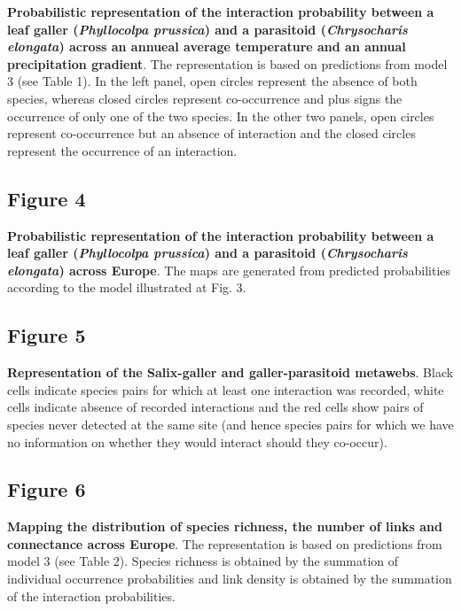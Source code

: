 \documentclass[12pt]{article}
\begin{document}
\textbf{Probabilistic representation of the interaction probability between a
leaf galler (\textit{Phyllocolpa prussica}) and a parasitoid
(\textit{Chrysocharis elongata}) across an annueal average temperature and an
annual precipitation gradient}. The representation is based on predictions
from model 3 (see Table 1). In the left panel, open circles represent the
absence of both species, whereas closed circles represent co-occurrence and
plus signs the occurrence of only one of the two species. In the other two
panels, open circles represent co-occurrence but an absence of interaction and
the closed circles represent the occurrence of an interaction.

\subsection*{Figure 4}

\textbf{Probabilistic representation of the interaction probability between a
leaf galler (\textit{Phyllocolpa prussica}) and a parasitoid
(\textit{Chrysocharis elongata}) across Europe}. The maps are generated from
predicted probabilities according to the model illustrated at Fig. 3.

\subsection*{Figure 5}

\textbf{Representation of the Salix-galler and galler-parasitoid metawebs}.
Black cells indicate species pairs for which at least one interaction was
recorded, white cells indicate absence of recorded interactions and the red
cells show pairs of species never detected at the same site (and hence species
pairs for which we have no information on whether they would interact should
they co-occur).

\subsection*{Figure 6}

\textbf{Mapping the distribution of species richness, the number of links and
connectance across Europe}. The representation is based on predictions from
model 3 (see Table 2). Species richness is obtained by the summation of
individual occurrence probabilities and link density is obtained by the
summation of the interaction probabilities. 
\end{document}
